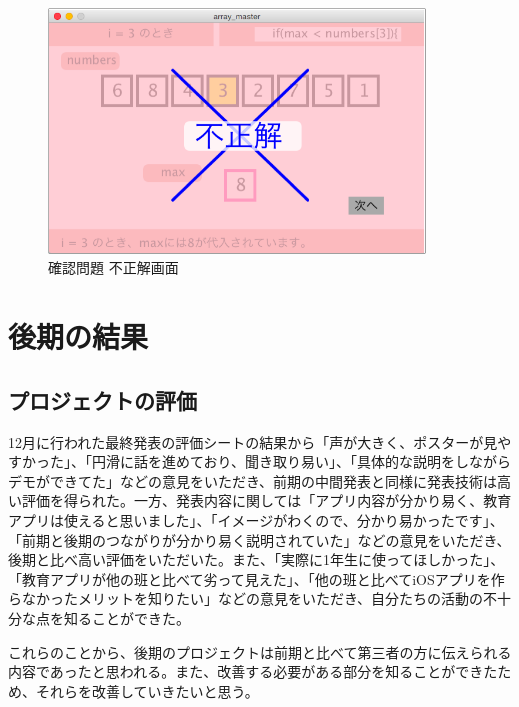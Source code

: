 \documentclass[openany,11pt,papersize]{jsbook}
\begin{document}
\begin{figure}[H]
\begin{center}
\includegraphics[width=10cm, bb=0 0 644 419]{img/9thParagraph/kakuninmondai_06.png}
\end{center}
\caption{確認問題 不正解画面}
\end{figure}



\chapter{後期の結果}

\section{プロジェクトの評価}
\par 12月に行われた最終発表の評価シートの結果から「声が大きく、ポスターが見やすかった」、「円滑に話を進めており、聞き取り易い」、「具体的な説明をしながらデモができてた」などの意見をいただき、前期の中間発表と同様に発表技術は高い評価を得られた。一方、発表内容に関しては「アプリ内容が分かり易く、教育アプリは使えると思いました」、「イメージがわくので、分かり易かったです」、「前期と後期のつながりが分かり易く説明されていた」などの意見をいただき、後期と比べ高い評価をいただいた。また、「実際に1年生に使ってほしかった」、「教育アプリが他の班と比べて劣って見えた」、「他の班と比べてiOSアプリを作らなかったメリットを知りたい」などの意見をいただき、自分たちの活動の不十分な点を知ることができた。
\par これらのことから、後期のプロジェクトは前期と比べて第三者の方に伝えられる内容であったと思われる。また、改善する必要がある部分を知ることができたため、それらを改善していきたいと思う。
\end{document}
